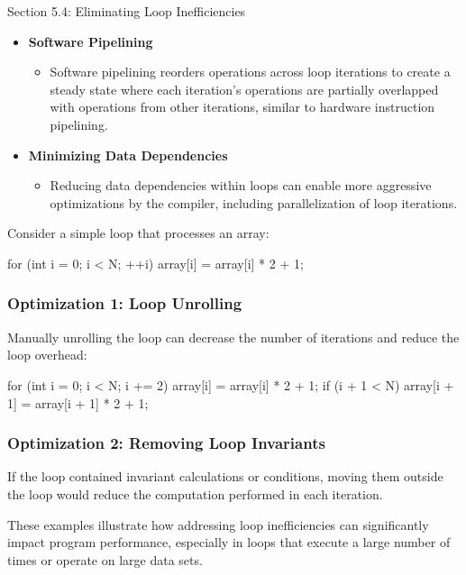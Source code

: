 \begin{notes}{Section 5.4: Eliminating Loop Inefficiencies}
\begin{itemize}
        \item \textbf{Software Pipelining}
        \begin{itemize}
            \item Software pipelining reorders operations across loop iterations to create a steady state where each iteration's operations are partially overlapped with operations from other iterations, 
            similar to hardware instruction pipelining.
        \end{itemize}
        \item \textbf{Minimizing Data Dependencies}
        \begin{itemize}
            \item Reducing data dependencies within loops can enable more aggressive optimizations by the compiler, including parallelization of loop iterations.
        \end{itemize}
    \end{itemize}
    
    \begin{highlight}
        Consider a simple loop that processes an array:
    
    \begin{code}[C]
    for (int i = 0; i < N; ++i) {
        array[i] = array[i] * 2 + 1;
    }
    \end{code}
    
        \subsubsection*{Optimization 1: Loop Unrolling}
    
        Manually unrolling the loop can decrease the number of iterations and reduce the loop overhead:

    \begin{code}[C]
    for (int i = 0; i < N; i += 2) {
        array[i] = array[i] * 2 + 1;
        if (i + 1 < N) {
            array[i + 1] = array[i + 1] * 2 + 1;
        }
    }
    \end{code}
    
        \subsubsection*{Optimization 2: Removing Loop Invariants}
    
        If the loop contained invariant calculations or conditions, moving them outside the loop would reduce the computation performed in each iteration.
    
        These examples illustrate how addressing loop inefficiencies can significantly impact program performance, especially in loops that execute a large number of times or operate on large data sets.
    \end{highlight}    
\end{notes}

